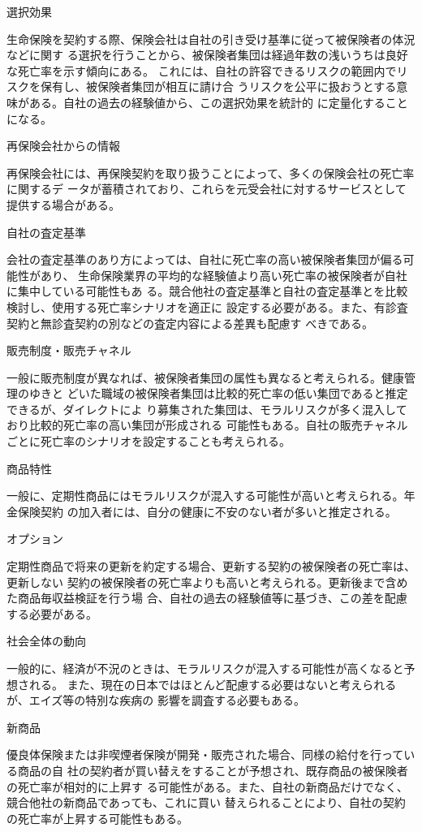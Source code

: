 \documentclass[report,gutter=10mm,fore-edge=10mm,uplatex,dvipdfmx]{jlreq}
\begin{document}
選択効果

生命保険を契約する際、保険会社は自社の引き受け基準に従って被保険者の体況などに関す
る選択を行うことから、被保険者集団は経過年数の浅いうちは良好な死亡率を示す傾向にある。
これには、自社の許容できるリスクの範囲内でリスクを保有し、被保険者集団が相互に請け合
うリスクを公平に扱おうとする意味がある。自社の過去の経験値から、この選択効果を統計的
に定量化することになる。

再保険会社からの情報

再保険会社には、再保険契約を取り扱うことによって、多くの保険会社の死亡率に関するデ
ータが蓄積されており、これらを元受会社に対するサービスとして提供する場合がある。

自社の査定基準

会社の査定基準のあり方によっては、自社に死亡率の高い被保険者集団が偏る可能性があり、
生命保険業界の平均的な経験値より高い死亡率の被保険者が自社に集中している可能性もあ
る。競合他社の査定基準と自社の査定基準とを比較検討し、使用する死亡率シナリオを適正に
設定する必要がある。また、有診査契約と無診査契約の別などの査定内容による差異も配慮す
べきである。

販売制度・販売チャネル

一般に販売制度が異なれば、被保険者集団の属性も異なると考えられる。健康管理のゆきと
どいた職域の被保険者集団は比較的死亡率の低い集団であると推定できるが、ダイレクトによ
り募集された集団は、モラルリスクが多く混入しており比較的死亡率の高い集団が形成される
可能性もある。自社の販売チャネルごとに死亡率のシナリオを設定することも考えられる。

商品特性

一般に、定期性商品にはモラルリスクが混入する可能性が高いと考えられる。年金保険契約
の加入者には、自分の健康に不安のない者が多いと推定される。

オプション

定期性商品で将来の更新を約定する場合、更新する契約の被保険者の死亡率は、更新しない
契約の被保険者の死亡率よりも高いと考えられる。更新後まで含めた商品毎収益検証を行う場
合、自社の過去の経験値等に基づき、この差を配慮する必要がある。

社会全体の動向

一般的に、経済が不況のときは、モラルリスクが混入する可能性が高くなると予想される。
また、現在の日本ではほとんど配慮する必要はないと考えられるが、エイズ等の特別な疾病の
影響を調査する必要もある。

新商品

優良体保険または非喫煙者保険が開発・販売された場合、同様の給付を行っている商品の自
社の契約者が買い替えをすることが予想され、既存商品の被保険者の死亡率が相対的に上昇す
る可能性がある。また、自社の新商品だけでなく、競合他社の新商品であっても、これに買い
替えられることにより、自社の契約の死亡率が上昇する可能性もある。
\end{document}
